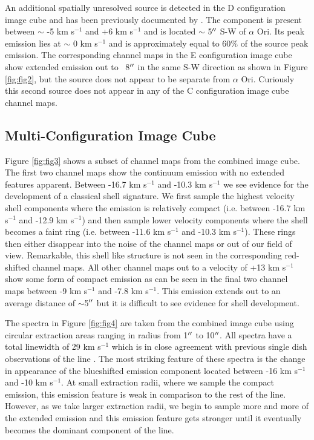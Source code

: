 \documentclass[preprint2]{aastex}
\begin{document}
An additional spatially unresolved source is detected in the D configuration image cube and has been previously documented by \citet{harp09}. The component is present between $\sim$ -5 km s${}^{-1}$ and +6 km s${}^{-1}$ and is located $\sim$ 5$\mbox{$^{\prime\prime}$}$ S-W of $\alpha$ Ori. Its peak emission lies at $\sim$ 0 km s${}^{-1}$ and is approximately equal to 60$\%$ of the source peak emission. The corresponding channel maps in the E configuration image cube show extended emission out to ~8$\mbox{$^{\prime\prime}$}$ in the same S-W direction as shown in Figure \ref{fig:fig2}, but the source does not appear to be separate from $\alpha$ Ori. Curiously this second source does not appear in any of the C configuration image cube channel maps. 


\subsection{Multi-Configuration Image Cube} \label{results2} 

Figure \ref{fig:fig3} shows a subset of channel maps from the combined image cube. The first two channel maps show the continuum emission with no extended features apparent. Between -16.7 km s${}^{-1}$ and -10.3 km s${}^{-1}$ we see evidence for the development of a classical shell signature. We first sample the highest velocity shell components where the emission is relatively compact (i.e. between -16.7 km s${}^{-1}$ and -12.9 km s${}^{-1}$) and then sample lower velocity components where the shell becomes a faint ring (i.e. between -11.6 km s${}^{-1}$ and -10.3 km s${}^{-1}$). These rings then either disappear into the noise of the channel maps or out of our field of view. Remarkable, this shell like structure is not seen in the corresponding red-shifted channel maps. All other channel maps out to a velocity of +13 km s${}^{-1}$ show some form of compact emission as can be seen in the final two channel maps between -9 km s${}^{-1}$ and -7.8 km s${}^{-1}$. This emission extends out to an average distance of $\sim$5$\mbox{$^{\prime\prime}$}$ but it is difficult to see evidence for shell development. 

The spectra in Figure \ref{fig:fig4} are taken from the combined image cube using circular extraction areas ranging in radius from 1$\mbox{$^{\prime\prime}$}$ to 10$\mbox{$^{\prime\prime}$}$. All spectra have a total linewidth of 29 km s${}^{-1}$ which is in close agreement with previous single dish observations of the line \citep{knap80, hugg86, hugg94}. The most striking feature of these spectra is the change in appearance of the blueshifted emission component located between -16 km s${}^{-1}$ and -10 km s${}^{-1}$.  At small extraction radii, where we sample the compact emission, this emission feature is weak in comparison to the rest of the line. However, as we take larger extraction radii, we begin to sample more and more of the extended emission and this emission feature gets stronger until it eventually becomes the dominant component of the line. 
\end{document}
